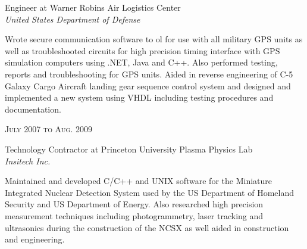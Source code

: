 \documentclass[10pt]{article} %
\begin{document}
{\begin{minipage}[t]{0.5\textwidth}
{\raggedright\large Engineer at Warner Robins Air Logistics Center\\
\textit{United States Department of Defense}\\[5pt]}

\small{Wrote secure communication software to
ol for use with all military GPS units as well as troubleshooted circuits for high precision timing interface with GPS simulation computers using .NET, Java and C++. Also performed testing, reports and troubleshooting for GPS units. Aided in reverse engineering of C-5 Galaxy Cargo Aircraft landing gear sequence control system and designed and implemented a new system using VHDL including testing procedures and documentation.}\\


{\raggedleft\textsc{July 2007 to Aug. 2009}\par}

{\raggedright\large Technology Contractor at Princeton University Plasma Physics Lab\\
\textit{Insitech Inc.}\\[5pt]}

\small{Maintained and developed C/C++ and UNIX software for the Miniature Integrated Nuclear Detection System used by the US Department of Homeland Security and US Department of Energy.  Also researched high precision measurement techniques including photogrammetry, laser tracking and ultrasonics during the construction of the NCSX as well aided in construction and engineering.
}\\


%
%



\end{minipage}}
\end{document}
